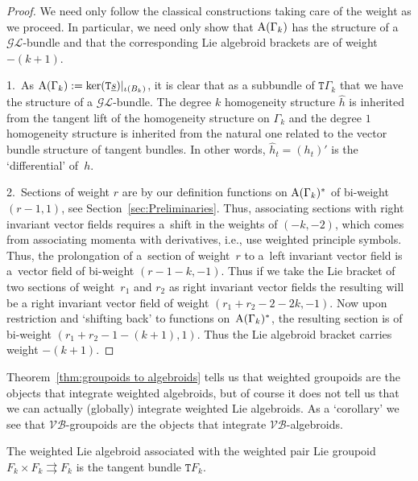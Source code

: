 \documentclass[10pt,a4paper]{amsart}
\newcommand{\rmA}{\textnormal{A}}
\def\sT{{\mathtt T}}
\numberwithin{equation}{section}
\begin{document}
\begin{proof}
We need only follow the classical constructions taking care of the weight as we proceed. In particular, we need only show that $\rmA(\Gamma_{k})$ has the structure of a $\mathcal{GL}$-bundle and that the corresponding Lie algebroid brackets are of weight~$-(k+1)$.

 1.~As  $\rmA(\Gamma_{k}) :=  \ker ( \sT\underline{s}  )  |_{\iota(B_{k})}$, it is clear that as a subbundle of $\sT \Gamma_{k}$ that we have the structure of a  $\mathcal{GL}$-bundle. The degree  $k$ homogeneity structure $\widehat{h}$ is inherited from the tangent lift of the homogeneity structure on $\Gamma_{k}$ and the degree $1$ homogeneity structure is inherited from the natural one related to the vector bundle structure of tangent bundles. In other words, $\widehat{h}_t=(h_t)'$ is the `dif\/ferential' of~$h$.

 2.~Sections of weight $r$  are by our def\/inition functions on $\rmA(\Gamma_{k})^{*}$ of bi-weight $(r-1,1)$, see Section~\ref{sec:Preliminaries}.  Thus, associating sections with right invariant vector f\/ields requires a~shift in the weights of $(-k, -2)$, which comes from associating momenta with derivatives, i.e., use weighted principle symbols. Thus, the prolongation of a~section of weight~$r$ to a~left invariant vector f\/ield is a~vector f\/ield  of bi-weight $(r-1-k,-1)$.  Thus if we take the Lie bracket of two sections of weight~$r_{1}$ and $r_{2}$ as right invariant vector f\/ields the resulting will be a  right invariant vector f\/ield of weight $(r_{1}+ r_{2}- 2 - 2k, -1)$. Now upon restriction and  `shifting back' to functions on~$\rmA(\Gamma_{k})^{*}$, the resulting section is of bi-weight $(r_{1}+ r_{2} -1 -(k+1), 1)$. Thus the Lie algebroid bracket carries weight $-(k+1)$.
\end{proof}



Theorem~\ref{thm:groupoids to algebroids} tells us that weighted groupoids are the objects that integrate weighted algebroids, but of course it does not tell us that we can actually (globally) integrate weighted Lie algebroids.  As a `corollary' we see that $\mathcal{VB}$-groupoids are the objects that integrate $\mathcal{VB}$-algebroids.

\begin{Example}
The weighted Lie algebroid associated with the weighted pair Lie groupoid $F_{k}\times F_{k} \rightrightarrows F_{k}$  is the tangent bundle $\sT F_{k}$.
\end{Example}
\end{document}
